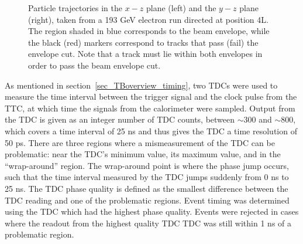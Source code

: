 \begin{figure}[!htbp]
\begin{centering}
\caption{Particle trajectories in the $x-z$ plane (left) and the $y-z$ plane (right), taken from a 193 GeV electron run directed at position 4L. The region shaded in blue corresponds to the beam envelope, while the black (red) markers correspond to tracks that pass (fail) the envelope cut. Note that a track must lie within both envelopes in order to pass the beam envelope cut. } 
\label{envelope_fig}
\end{centering}
\end{figure}



As mentioned in section~\ref{sec_TBoverview_timing}, two TDCs were used to measure the time interval between the trigger signal and the clock pulse from the TTC, at which time the signals from the calorimeter were sampled. Output from the TDC is given as an integer number of TDC counts, between $\sim 300$ and $\sim 800$, which covers a time interval of 25 ns and thus gives the TDC a time resolution of 50 ps. There are three regions where a mismeasurement of the TDC can be problematic: near the TDC's minimum value, its maximum value, and in the ``wrap-around'' region. The wrap-around point is where the phase jump occurs, such that the time interval measured by the TDC jumps suddenly from 0 ns to 25 ns. The TDC phase quality is defined as the smallest difference between the TDC reading and one of the problematic regions. Event timing was determined using the TDC which had the highest phase quality. Events were rejected in cases where the readout from the highest quality TDC TDC was still within 1 ns of a problematic region.

%
%

